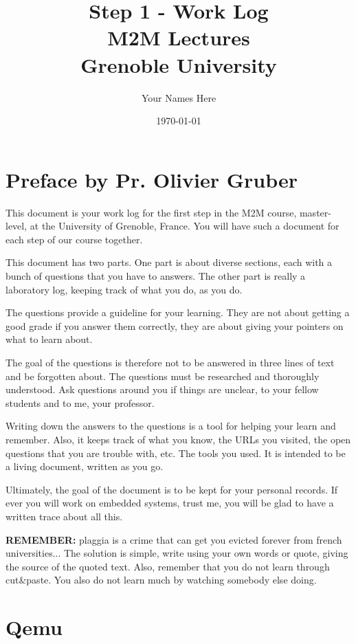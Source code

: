 \documentclass[10]{article}
\begin{document}
\title{Step 1 - Work Log \\
M2M Lectures\\
Grenoble University}
\author{Your Names Here}
\date{\today}
\maketitle

\section{Preface by Pr. Olivier Gruber}

This document is your work log for the first step in the 
M2M course, master-level, at the University of Grenoble, France.
You will have such a document for each step of our course
together.

This document has two parts. One part is about diverse
sections, each with a bunch of questions 
that you have to answers. The other part is really 
a laboratory log, keeping track of what you do, 
as you do.

The questions provide a guideline for your learning. 
They are not about getting a good grade if you answer them
correctly, they are about giving your pointers on what to 
learn about.

The goal of the questions is therefore not to be answered 
in three lines of text and be forgotten about. The questions
must be researched and thoroughly understood. Ask questions
around you if things are unclear, to your fellow students
and to me, your professor. 

Writing down the answers to the questions is a tool for helping
your learn and remember. Also, it keeps track of what you know,
the URLs you visited, the open questions that you are trouble with,
etc. The tools you used. It is intended to be a living document,
written as you go.

Ultimately, the goal of the document is to be kept for 
your personal records. If ever you will work on embedded
systems, trust me, you will be glad to have a written 
trace about all this.

{\bf REMEMBER:} plaggia is a crime that can get you evicted
forever from french universities... The solution is simple,
write using your own words or quote, giving the source of
the quoted text. Also, remember that you do not learn through
cut\&paste. You also do not learn much by watching somebody else
doing.

\section{Qemu}
\end{document}
